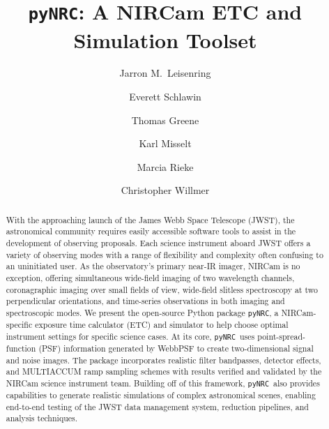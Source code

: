 \documentclass[modern, linenumbers]{aastex62}
\newcommand{\pynrc}{\texttt{\MakeLowercase{py}NRC}}
\begin{document}
\title{\pynrc: A NIRCam ETC and Simulation Toolset}

\author[0000-0002-0834-6140]{Jarron M.\ Leisenring}

\author{Everett Schlawin}


\author{Thomas Greene}

\author{Karl Misselt}

\author{Marcia Rieke}

\author{Christopher Willmer}



\begin{abstract}
With the approaching launch of the James Webb Space Telescope (JWST), the astronomical community requires easily accessible software tools to assist in the development of observing proposals. 
Each science instrument aboard JWST offers a variety of observing modes with a range of flexibility and complexity often confusing to an uninitiated user. 
As the observatory's primary near-IR imager, NIRCam is no exception, offering simultaneous wide-field imaging of two wavelength channels, coronagraphic imaging over small fields of view, wide-field slitless spectroscopy at two perpendicular orientations, and time-series observations in both imaging and spectroscopic modes. 
We present the open-source Python package \pynrc, a NIRCam-specific exposure time calculator (ETC) and simulator to help choose optimal instrument settings for specific science cases. 
At its core, \pynrc\ uses point-spread-function (PSF) information generated by WebbPSF to create two-dimensional signal and noise images. 
The package incorporates realistic filter bandpasses, detector effects, and MULTIACCUM ramp sampling schemes with results verified and validated by the NIRCam science instrument team. 
Building off of this framework, \pynrc\ also provides capabilities to generate realistic simulations of complex astronomical scenes, enabling end-to-end testing of the JWST data management system, reduction pipelines, and analysis techniques.\end{abstract}
\end{document}
